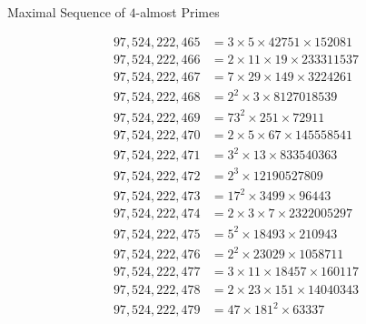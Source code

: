 \documentclass[20pt]{article}
\begin{document}

Maximal Sequence of $4$-almost Primes

\begin{align*}
97,524,222,465 &= 3 \times 5 \times 42751 \times 152081 \\
97,524,222,466 &= 2 \times 11 \times 19 \times 233311537 \\
97,524,222,467 &= 7 \times 29 \times 149 \times 3224261 \\
97,524,222,468 &= 2^2 \times 3 \times 8127018539 \\
97,524,222,469 &= 73^2 \times 251 \times 72911 \\
97,524,222,470 &= 2 \times 5 \times 67 \times 145558541 \\
97,524,222,471 &= 3^2 \times 13 \times 833540363 \\
97,524,222,472 &= 2^3 \times 12190527809 \\
97,524,222,473 &= 17^2 \times 3499 \times 96443 \\
97,524,222,474 &= 2 \times 3 \times 7 \times 2322005297 \\
97,524,222,475 &= 5^2 \times 18493 \times 210943 \\
97,524,222,476 &= 2^2 \times 23029 \times 1058711 \\
97,524,222,477 &= 3 \times 11 \times 18457 \times 160117 \\
97,524,222,478 &= 2 \times 23 \times 151 \times 14040343 \\
97,524,222,479 &= 47 \times 181^2 \times 63337 
\end{align*}
\end{document}
